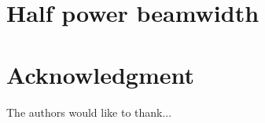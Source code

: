 \documentclass[journal]{IEEEtran}
\begin{document}
\section{Half power beamwidth}
\label{apdx_HPBW}

% 
\section*{Acknowledgment}

The authors would like to thank...


\ifCLASSOPTIONcaptionsoff
  \newpage
\fi






% 
%


\end{document}
